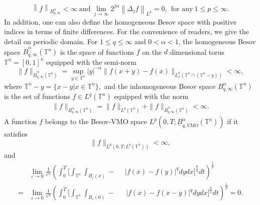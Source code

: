 \documentclass[11pt]{article}
\theoremstyle{plain}\newtheorem{definition}{Definition}[section]
\theoremstyle{definition}\newtheorem{theorem}{Theorem}[section]
\theoremstyle{plain}\newtheorem{lemma}[theorem]{Lemma}
\theoremstyle{plain}\newtheorem{coro}[theorem]{Corollary}
\theoremstyle{plain}\newtheorem{prop}[theorem]{Proposition}
\theoremstyle{remark}\newtheorem{remark}{Remark}[section]
\newcommand{\norm}[1]{\left\|#1\right\|}
\newcommand{\B}{\Big}
\newcommand{\be}{\begin{equation}}
\newcommand{\ee}{\end{equation}}
\newcommand{\ba}{\begin{aligned}}
\newcommand{\ea}{\end{aligned}}
\newcommand{\fbxo}{\int_{B_{\varepsilon}(x)}\!\!\!\!\!\!\!\!\!\!\!\!\!\!\!\! -~\,\,~\,~\,}
\newcommand{\fbxoo}{\int_{B_{\varepsilon}(0)}\!\!\!\!\!\!\!\!\!\!\!\!\!\!\!\! -~\,~\,~\,~\,}
\newcommand{\f}{\frac}
\numberwithin{equation}{section}
\begin{document}
\begin{equation}\label{2.1}
\norm{f}_{ {B}^\alpha _{p,\infty}}<\infty~ \text{and}~ 	\lim_{j\rightarrow \infty} 2^{j\alpha}\norm{ {\Delta}_j f}_{L^p}=0,~~\text{for any}~1\leq p\leq \infty.
\end{equation}
In addition, one can also define the homogeneous Besov space with positive indices  in terms of finite differences.
  For the convenience of readers, we give the detail on periodic domain.   For $1\leq q\leq \infty$ and $0<\alpha<1$, the homogeneous Besov space $\dot{B}^{\alpha}_{q,\infty}(\mathbb{T}^{n})$ is the space of functions $f$ on the $d$ dimensional torus $\mathbb{T}^{n}=[0,1]^{n}$ equipped with the semi-norm
 \be\label{besov1} \|f\|_{\dot{B}^{\alpha}_{q,\infty}(\mathbb{T}^{n})}= \sup_{y\in \mathbb{T}^{n}} |y|^{-\alpha}\B\| f(x+y)-f(x)\B\|
 _{L_{x}^{q}(\mathbb{T}^{n}\cap(\mathbb{T}^{n}-y))} <\infty,\ee
where $\mathbb{T}^{n}-y=\{x-y|x\in \mathbb{T}^{n}\},$ and the inhomogeneous Besov space $B^{\alpha}_{q,\infty}(\mathbb{T}^{n})$ is the set of functions $f\in L^{q}(\mathbb{T}^{n})$ equipped with the norm
 $$\ba
  \|f\|_{B^{\alpha}_{q,\infty}(\mathbb{T}^{n})}= \|f\|_{L^{q}(\mathbb{T}^{n})}
  +\|f\|_{\dot{B}^{\alpha}_{q,\infty}(\mathbb{T}^{n})}<\infty.\ea$$
A function $f$ belongs to
the Besov-VMO space  $L^p(0,T;\underline{B}^{\alpha}_{q,VMO}(\mathbb{T}^n))$  if it satisfies
$$\|f\|_{L^p(0,T;L^q(\mathbb{T}^n))}<\infty,$$
and
$$\ba
&\lim_{\varepsilon\rightarrow0}\f{1}{\varepsilon^{\alpha}}\left(\int_0^T\B[\int_{\mathbb{T}^n} \fbxo|f(x)-f(y)|^{q}dydx \B]^{\f{p}{q}}dt\right)^{\f1p}\\
=&\lim_{\varepsilon\rightarrow0}\f{1}{\varepsilon^{\alpha}}\left(\int_0^T\B[\int_{\mathbb{T}^n} \fbxoo|f(x)-f(x-y)|^{q}dydx \B]^{\f{p}{q}}dt\right)^{\f{1}{p}}=0.
\ea$$
\end{document}
